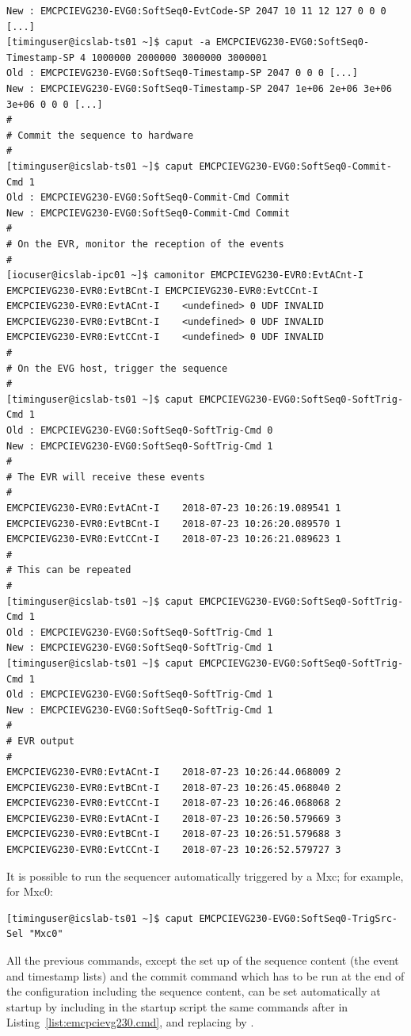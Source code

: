 \documentclass[11pt
  , a4paper
  , article
  , oneside
  , showtrims
]{memoir}
\begin{document}
\begin{lstlisting}[style=termstyle]
New : EMCPCIEVG230-EVG0:SoftSeq0-EvtCode-SP 2047 10 11 12 127 0 0 0 [...]
[timinguser@icslab-ts01 ~]$ caput -a EMCPCIEVG230-EVG0:SoftSeq0-Timestamp-SP 4 1000000 2000000 3000000 3000001
Old : EMCPCIEVG230-EVG0:SoftSeq0-Timestamp-SP 2047 0 0 0 [...]
New : EMCPCIEVG230-EVG0:SoftSeq0-Timestamp-SP 2047 1e+06 2e+06 3e+06 3e+06 0 0 0 [...]
#
# Commit the sequence to hardware
#
[timinguser@icslab-ts01 ~]$ caput EMCPCIEVG230-EVG0:SoftSeq0-Commit-Cmd 1
Old : EMCPCIEVG230-EVG0:SoftSeq0-Commit-Cmd Commit
New : EMCPCIEVG230-EVG0:SoftSeq0-Commit-Cmd Commit
#
# On the EVR, monitor the reception of the events
#
[iocuser@icslab-ipc01 ~]$ camonitor EMCPCIEVG230-EVR0:EvtACnt-I EMCPCIEVG230-EVR0:EvtBCnt-I EMCPCIEVG230-EVR0:EvtCCnt-I
EMCPCIEVG230-EVR0:EvtACnt-I    <undefined> 0 UDF INVALID
EMCPCIEVG230-EVR0:EvtBCnt-I    <undefined> 0 UDF INVALID
EMCPCIEVG230-EVR0:EvtCCnt-I    <undefined> 0 UDF INVALID
#
# On the EVG host, trigger the sequence
#
[timinguser@icslab-ts01 ~]$ caput EMCPCIEVG230-EVG0:SoftSeq0-SoftTrig-Cmd 1
Old : EMCPCIEVG230-EVG0:SoftSeq0-SoftTrig-Cmd 0
New : EMCPCIEVG230-EVG0:SoftSeq0-SoftTrig-Cmd 1
#
# The EVR will receive these events
#
EMCPCIEVG230-EVR0:EvtACnt-I    2018-07-23 10:26:19.089541 1
EMCPCIEVG230-EVR0:EvtBCnt-I    2018-07-23 10:26:20.089570 1
EMCPCIEVG230-EVR0:EvtCCnt-I    2018-07-23 10:26:21.089623 1
#
# This can be repeated
#
[timinguser@icslab-ts01 ~]$ caput EMCPCIEVG230-EVG0:SoftSeq0-SoftTrig-Cmd 1
Old : EMCPCIEVG230-EVG0:SoftSeq0-SoftTrig-Cmd 1
New : EMCPCIEVG230-EVG0:SoftSeq0-SoftTrig-Cmd 1
[timinguser@icslab-ts01 ~]$ caput EMCPCIEVG230-EVG0:SoftSeq0-SoftTrig-Cmd 1
Old : EMCPCIEVG230-EVG0:SoftSeq0-SoftTrig-Cmd 1
New : EMCPCIEVG230-EVG0:SoftSeq0-SoftTrig-Cmd 1
#
# EVR output
#
EMCPCIEVG230-EVR0:EvtACnt-I    2018-07-23 10:26:44.068009 2
EMCPCIEVG230-EVR0:EvtBCnt-I    2018-07-23 10:26:45.068040 2
EMCPCIEVG230-EVR0:EvtCCnt-I    2018-07-23 10:26:46.068068 2
EMCPCIEVG230-EVR0:EvtACnt-I    2018-07-23 10:26:50.579669 3
EMCPCIEVG230-EVR0:EvtBCnt-I    2018-07-23 10:26:51.579688 3
EMCPCIEVG230-EVR0:EvtCCnt-I    2018-07-23 10:26:52.579727 3
\end{lstlisting}

It is possible to run the sequencer automatically triggered by a Mxc; for example, for Mxc0:
\begin{lstlisting}
[timinguser@icslab-ts01 ~]$ caput EMCPCIEVG230-EVG0:SoftSeq0-TrigSrc-Sel "Mxc0"
\end{lstlisting}

All the previous commands, except the set up of the sequence content (the event and timestamp lists) and the commit command which has to be run at the end of the configuration including the sequence content, can be set automatically at startup by including in the startup script the same commands after  in Listing~\ref{list:emcpcievg230.cmd}, and replacing  by .
\end{document}
